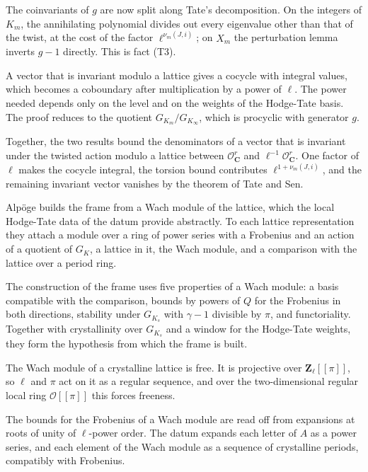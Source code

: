 The coinvariants of $g$ are now split along Tate's decomposition. On the integers
of $K_m$, the annihilating polynomial divides out every eigenvalue other than
that of the twist, at the cost of the factor $\ell^{\nu_m(J,i)}$; on $X_m$ the
perturbation lemma inverts $g-1$ directly. This is fact (T3).

A vector that is invariant modulo a lattice gives a cocycle with integral
values, which becomes a coboundary after multiplication by a power of $\ell$.
The power needed depends only on the level and on the weights of the
Hodge-Tate basis. The proof reduces to the quotient $G_{K_m}/G_{K_\infty}$, which
is procyclic with generator $g$.

Together, the two results bound the denominators of a vector that is invariant
under the twisted action modulo a lattice between $\mathcal O_{\mathbf C}^r$
and $\ell^{-1}\mathcal O_{\mathbf C}^r$. One factor of $\ell$ makes the cocycle
integral, the torsion bound contributes $\ell^{1+\nu_m(J,i)}$, and the
remaining invariant vector vanishes by the theorem of Tate and Sen.

Alpöge builds the frame from a Wach module of the lattice, which the local
Hodge-Tate data of the datum provide abstractly. To each lattice representation
they attach a module over a ring of power series with a Frobenius and an action
of a quotient of $G_K$, a lattice in it, the Wach module, and a comparison with
the lattice over a period ring.

The construction of the frame uses five properties of a Wach module: a basis
compatible with the comparison, bounds by powers of $Q$ for the Frobenius in
both directions, stability under $G_{K_s}$ with $\gamma-1$ divisible by $\pi$,
and functoriality. Together with crystallinity over $G_{K_s}$ and a window for
the Hodge-Tate weights, they form the hypothesis from which the frame is built.

The Wach module of a crystalline lattice is free. It is projective over
$\mathbf Z_\ell[[\pi]]$, so $\ell$ and $\pi$ act on it as a regular sequence,
and over the two-dimensional regular local ring $\mathcal O[[\pi]]$ this forces
freeness.

The bounds for the Frobenius of a Wach module are read off from expansions at
roots of unity of $\ell$-power order. The datum expands each letter of $A$ as a
power series, and each element of the Wach module as a sequence of crystalline
periods, compatibly with Frobenius.

